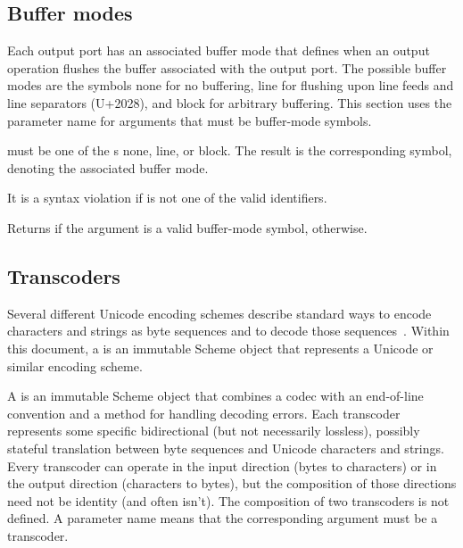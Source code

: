 \subsection{Buffer modes}

Each output port has an associated buffer mode that defines when an
output operation flushes the buffer associated with the output
port. The possible buffer modes are the symbols {\cf none} for no buffering,
{\cf line} for flushing upon line feeds and line separators (U+2028), and
{\cf block} for arbitrary buffering.  This section uses the parameter name
 for arguments that must be buffer-mode symbols.

\begin{entry}{%
}
   
 must be one of the s {\cf none}, {\cf line}, or
{\cf block}. The result is the corresponding symbol, denoting the
associated buffer mode.

It is a syntax violation if  is not one of the valid
identifiers.
\end{entry}

\begin{entry}{%
}
   
Returns \schtrue{} if the argument is a valid buffer-mode symbol,
\schfalse{} otherwise.
\end{entry}

\subsection{Transcoders}

Several different Unicode encoding schemes describe standard ways to
encode characters and strings as byte sequences and to decode those
sequences~\cite{Unicode}.
Within this document, a  is an immutable Scheme
object that represents a Unicode or similar encoding scheme.

A  is an immutable Scheme object that combines
a codec with an end-of-line convention and a method for handling
decoding errors.
Each transcoder represents some specific bidirectional (but not
necessarily lossless), possibly stateful translation between byte
sequences and Unicode characters and strings.
Every transcoder can operate in the input direction (bytes to characters)
or in the output direction (characters to bytes),
but the composition of those directions need not be identity (and
often isn't).  The composition of two transcoders is not defined.
A  parameter name means that the corresponding
argument must be a transcoder.

